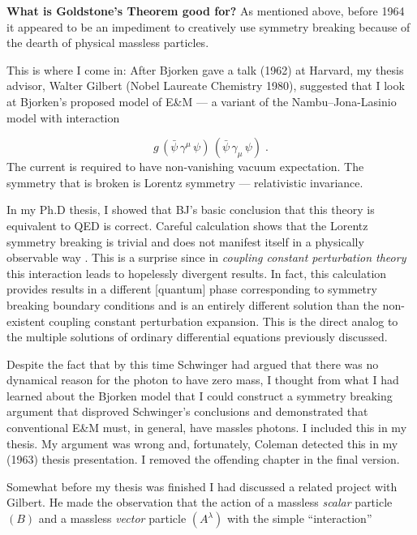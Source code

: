 \documentclass[preprintnumbers,12pt]{revtex4-2}
\begin{document}
\textbf{What is Goldstone's Theorem good for?}
As mentioned above, before 1964 it appeared to be an impediment to creatively use symmetry breaking
because of the dearth of physical massless particles.

This is where I come in: After Bjorken gave a talk (1962) at Harvard,
my thesis advisor, Walter Gilbert (Nobel Laureate Chemistry 1980),
suggested that I look at Bjorken's proposed model of E\&M \cite{jb;1963} --- a
variant of the Nambu--Jona-Lasinio model with interaction

\begin{equation*}
  g\, (\bar\psi\, \gamma^{\mu}\, \psi)\, (\bar\psi\, \gamma_{\mu}\, \psi) \; .
\end{equation*}
The current is required to have non-vanishing vacuum expectation.
The symmetry that is broken is Lorentz symmetry --- relativistic
invariance.

In my Ph.D thesis, I showed that BJ's basic conclusion that this
theory is equivalent to QED is correct. Careful calculation shows that
the Lorentz symmetry breaking is trivial and does not manifest itself
in a physically observable way \cite{ggff1;1964,ggff2;1964}. This is a surprise since in
\emph{coupling constant perturbation theory} this interaction leads
to hopelessly divergent results. In fact, this calculation provides results in a different [quantum]
phase corresponding to symmetry breaking boundary conditions and is an
entirely different solution than the non-existent coupling constant
perturbation expansion. This is the direct analog to the multiple solutions of  ordinary
differential equations previously discussed.


Despite the fact that by this time Schwinger \cite{sch1;1962} had
argued that there was no dynamical reason for the photon to have zero
mass, I thought from what I had learned about the Bjorken model that I
could construct a symmetry breaking argument that disproved Schwinger's
conclusions and demonstrated that conventional E\&M must, in general,
have massles photons. I included this in my thesis. My argument was
wrong and, fortunately, Coleman detected this in my (1963) thesis
presentation. I removed the offending chapter in the final version.

Somewhat before my thesis was finished I had discussed a related
project with Gilbert. He made the observation that the action of a
massless \emph{scalar} particle $(B)$ and a massless \emph{vector}
particle $(A^{\lambda})$ with the simple ``interaction''
\end{document}
